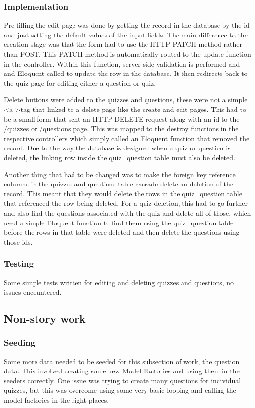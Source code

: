 \subsubsection{Implementation}
Pre filling the edit page was done by getting the record in the database by the id and just setting the default values of the input fields. The main difference to the creation stage was that the form had to use the HTTP PATCH method rather than POST. This PATCH method is automatically routed to the update function in the controller\cite{laravel-resource-controller}. Within this function, server side validation is performed and and Eloquent called to update the row in the database. It then redirects back to the quiz page for editing either a question or quiz.

Delete buttons were added to the quizzes and questions, these were not a simple \textless a \textgreater tag that linked to a delete page like the create and edit pages. This had to be a small form that sent an HTTP DELETE request along with an id to the /quizzes or /questions page. This was mapped to the destroy functions in the respective controllers which simply called an Eloquent function that removed the record. Due to the way the database is designed when a quiz or question is deleted, the linking row inside the quiz\_question table must also be deleted. 

Another thing that had to be changed was to make the foreign key reference columns in the quizzes and questions table cascade delete on deletion of the record. This meant that they would delete the rows in the quiz\_question table that referenced the row being deleted. For a quiz deletion, this had to go further and also find the questions associated with the quiz and delete all of those, which used a simple Eloquent function to find them using the quiz\_question table before the rows in that table were deleted and then delete the questions using those ids. 
\subsubsection{Testing}
Some simple tests written for editing and deleting quizzes and questions, no issues encountered.
\newpage

\subsection{Non-story work}
\subsubsection{Seeding}
Some more data needed to be seeded for this subsection of work, the question data. This involved creating some new Model Factories and using them in the seeders correctly. One issue was trying to create many questions for individual quizzes, but this was overcome using some very basic looping and calling the model factories in the right places.
